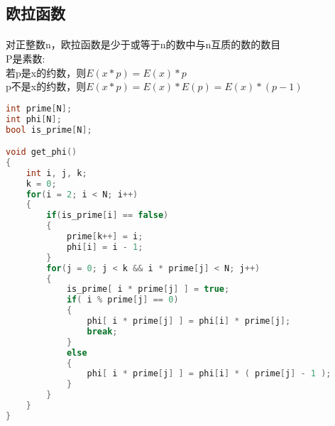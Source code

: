 ﻿\subsection{欧拉函数}
\paragraph{}
对正整数n，欧拉函数是少于或等于n的数中与n互质的数的数目 \\
P是素数:\\
若p是x的约数，则$ E(x*p)=E(x)*p $ \\
p不是x的约数，则$ E(x*p)=E(x)*E(p)=E(x)*(p-1) $ \\
    \begin{lstlisting}[language=C++]
int prime[N];
int phi[N];
bool is_prime[N];

void get_phi()
{
    int i, j, k;
    k = 0;
    for(i = 2; i < N; i++)
    {
        if(is_prime[i] == false)
        {
            prime[k++] = i;
            phi[i] = i - 1;
        }
        for(j = 0; j < k && i * prime[j] < N; j++)
        {
            is_prime[ i * prime[j] ] = true;
            if( i % prime[j] == 0)
            {
                phi[ i * prime[j] ] = phi[i] * prime[j];
                break;
            }
            else
            {
                phi[ i * prime[j] ] = phi[i] * ( prime[j] - 1 );
            }
        }
    }
}
\end{lstlisting}
